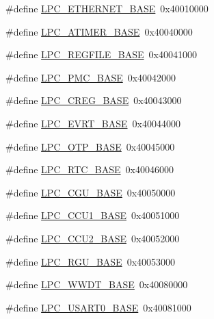 \begin{DoxyCompactItemize}
\item 
\#define \hyperlink{group___p_e_r_i_p_h__43_x_x___b_a_s_e_ga7da6912c1d137fdfb86cedc9efb8c8d6}{L\+P\+C\+\_\+\+E\+T\+H\+E\+R\+N\+E\+T\+\_\+\+B\+A\+SE}~0x40010000
\item 
\#define \hyperlink{group___p_e_r_i_p_h__43_x_x___b_a_s_e_gaccf3a9c6522b5cfc6d9ddc21f0500ec0}{L\+P\+C\+\_\+\+A\+T\+I\+M\+E\+R\+\_\+\+B\+A\+SE}~0x40040000
\item 
\#define \hyperlink{group___p_e_r_i_p_h__43_x_x___b_a_s_e_gad2674eff10cea9243ab060ad1fbac9d2}{L\+P\+C\+\_\+\+R\+E\+G\+F\+I\+L\+E\+\_\+\+B\+A\+SE}~0x40041000
\item 
\#define \hyperlink{group___p_e_r_i_p_h__43_x_x___b_a_s_e_gad729bfbe3e327b259732dd0817d6e34b}{L\+P\+C\+\_\+\+P\+M\+C\+\_\+\+B\+A\+SE}~0x40042000
\item 
\#define \hyperlink{group___p_e_r_i_p_h__43_x_x___b_a_s_e_ga862ac15bfc87b2a8525acacccedfba61}{L\+P\+C\+\_\+\+C\+R\+E\+G\+\_\+\+B\+A\+SE}~0x40043000
\item 
\#define \hyperlink{group___p_e_r_i_p_h__43_x_x___b_a_s_e_ga921b2ba31c8defad6d1c44ca9406e893}{L\+P\+C\+\_\+\+E\+V\+R\+T\+\_\+\+B\+A\+SE}~0x40044000
\item 
\#define \hyperlink{group___p_e_r_i_p_h__43_x_x___b_a_s_e_ga611c7ec908d7802a811bd8a06163d05c}{L\+P\+C\+\_\+\+O\+T\+P\+\_\+\+B\+A\+SE}~0x40045000
\item 
\#define \hyperlink{group___p_e_r_i_p_h__43_x_x___b_a_s_e_ga4618213cf968f8245814d7d3e7aa2e2e}{L\+P\+C\+\_\+\+R\+T\+C\+\_\+\+B\+A\+SE}~0x40046000
\item 
\#define \hyperlink{group___p_e_r_i_p_h__43_x_x___b_a_s_e_ga560da3a74764a9e89bef655f3daa8b0e}{L\+P\+C\+\_\+\+C\+G\+U\+\_\+\+B\+A\+SE}~0x40050000
\item 
\#define \hyperlink{group___p_e_r_i_p_h__43_x_x___b_a_s_e_gaf7df220ef74f9e793259c495db5e5956}{L\+P\+C\+\_\+\+C\+C\+U1\+\_\+\+B\+A\+SE}~0x40051000
\item 
\#define \hyperlink{group___p_e_r_i_p_h__43_x_x___b_a_s_e_gab3b7e06c5e7e1913c555e584e2092f21}{L\+P\+C\+\_\+\+C\+C\+U2\+\_\+\+B\+A\+SE}~0x40052000
\item 
\#define \hyperlink{group___p_e_r_i_p_h__43_x_x___b_a_s_e_gaff6de015a63620b4c552891c1ac9f756}{L\+P\+C\+\_\+\+R\+G\+U\+\_\+\+B\+A\+SE}~0x40053000
\item 
\#define \hyperlink{group___p_e_r_i_p_h__43_x_x___b_a_s_e_ga9b83c39ba53f9c9e87974984c96e35de}{L\+P\+C\+\_\+\+W\+W\+D\+T\+\_\+\+B\+A\+SE}~0x40080000
\item 
\#define \hyperlink{group___p_e_r_i_p_h__43_x_x___b_a_s_e_gaa878cf5cffe359eaf1eba511ab537ba9}{L\+P\+C\+\_\+\+U\+S\+A\+R\+T0\+\_\+\+B\+A\+SE}~0x40081000

\end{DoxyCompactItemize}
